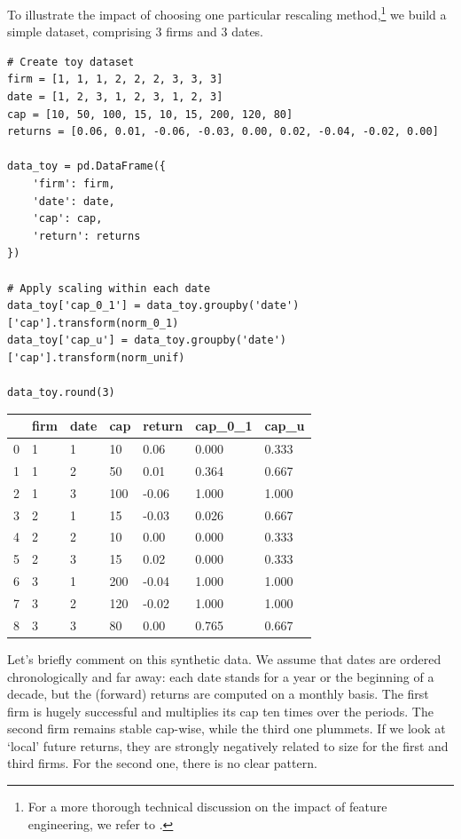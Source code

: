To illustrate the impact of choosing one particular rescaling method,\footnote{For a more thorough technical discussion on the impact of feature engineering, we refer to \cite{galili2016splitting}.} we build a simple dataset, comprising 3 firms and 3 dates.

\begin{verbatim}
# Create toy dataset
firm = [1, 1, 1, 2, 2, 2, 3, 3, 3]
date = [1, 2, 3, 1, 2, 3, 1, 2, 3]
cap = [10, 50, 100, 15, 10, 15, 200, 120, 80]
returns = [0.06, 0.01, -0.06, -0.03, 0.00, 0.02, -0.04, -0.02, 0.00]

data_toy = pd.DataFrame({
    'firm': firm,
    'date': date,
    'cap': cap,
    'return': returns
})

# Apply scaling within each date
data_toy['cap_0_1'] = data_toy.groupby('date')['cap'].transform(norm_0_1)
data_toy['cap_u'] = data_toy.groupby('date')['cap'].transform(norm_unif)

data_toy.round(3)
\end{verbatim}

\bigskip\noindent
\begin{tabular}{p{}p{}p{}p{}p{}p{}p{}}
\toprule
 & firm & date & cap & return & cap\_0\_1 & cap\_u \\
\hline
0 & 1 & 1 & 10 & 0.06 & 0.000 & 0.333 \\
\hline
1 & 1 & 2 & 50 & 0.01 & 0.364 & 0.667 \\
\hline
2 & 1 & 3 & 100 & -0.06 & 1.000 & 1.000 \\
\hline
3 & 2 & 1 & 15 & -0.03 & 0.026 & 0.667 \\
\hline
4 & 2 & 2 & 10 & 0.00 & 0.000 & 0.333 \\
\hline
5 & 2 & 3 & 15 & 0.02 & 0.000 & 0.333 \\
\hline
6 & 3 & 1 & 200 & -0.04 & 1.000 & 1.000 \\
\hline
7 & 3 & 2 & 120 & -0.02 & 1.000 & 1.000 \\
\hline
8 & 3 & 3 & 80 & 0.00 & 0.765 & 0.667 \\
\hline
\bottomrule
\end{tabular}

\bigskip

Let's briefly comment on this synthetic data. We assume that dates are ordered chronologically and far away: each date stands for a year or the beginning of a decade, but the (forward) returns are computed on a monthly basis. The first firm is hugely successful and multiplies its cap ten times over the periods. The second firm remains stable cap-wise, while the third one plummets. If we look at `local' future returns, they are strongly negatively related to size for the first and third firms. For the second one, there is no clear pattern.

